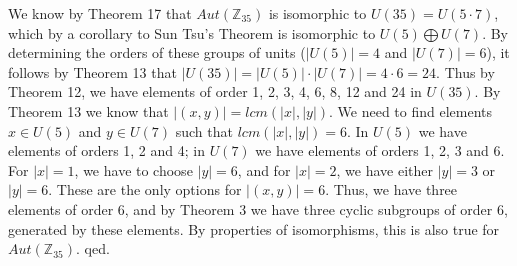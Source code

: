 \documentclass{article}
\newcommand{\Z}{\mathbb{Z}}
\begin{document}
 We know by Theorem 17 that $Aut(\Z_{35})$ is isomorphic to $U(35)=U(5\cdot7)$, which by a corollary to Sun Tsu's Theorem is isomorphic to $U(5)\bigoplus U(7)$. By determining the orders of these groups of units ($|U(5)|=4$ and $|U(7)|=6$), it follows by Theorem 13 that $|U(35)|=|U(5)|\cdot|U(7)|=4\cdot 6=24$. Thus by Theorem 12, we have elements of order 1, 2, 3, 4, 6, 8, 12 and 24 in $U(35)$. By Theorem 13 we know that $|(x,y)|=lcm(|x|,|y|)$. We need to find elements $x \in U(5)$ and $y \in U(7)$ such that $lcm(|x|,|y|)=6$. In $U(5)$ we have elements of orders 1, 2 and 4; in $U(7)$ we have elements of orders 1, 2, 3 and 6. For $|x|=1$, we have to choose $|y|=6$, and for $|x|=2$, we have either $|y|=3$ or $|y|=6$. These are the only options for $|(x,y)|=6$. Thus, we have three elements of order 6, and by Theorem 3 we have three cyclic subgroups of order 6, generated by these elements. By properties of isomorphisms, this is also true for $Aut(\Z_{35})$. qed. \\
\end{document}
